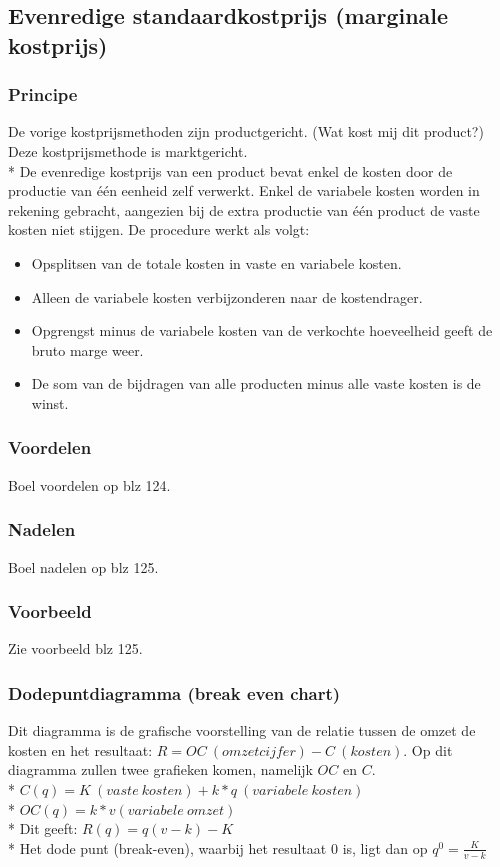 \documentclass[12pt]{article}
\begin{document}
\subsection{Evenredige standaardkostprijs (marginale kostprijs)}
\subsubsection{Principe}
De vorige kostprijsmethoden zijn productgericht. (Wat kost mij dit product?) Deze kostprijsmethode is marktgericht.\\*
De evenredige kostprijs van een product bevat enkel de kosten door de productie van \'e\'en eenheid zelf verwerkt. Enkel de variabele kosten worden in rekening gebracht, aangezien bij de extra productie van \'e\'en product de vaste kosten niet stijgen. De procedure werkt als volgt:
\begin{itemize}
\item Opsplitsen van de totale kosten in vaste en variabele kosten.
\item Alleen de variabele kosten verbijzonderen naar de kostendrager.
\item Opgrengst minus de variabele kosten van de verkochte hoeveelheid geeft de bruto marge weer.
\item De som van de bijdragen van alle producten minus alle vaste kosten is de winst.
\end{itemize}
\subsubsection{Voordelen}
Boel voordelen op blz 124.
\subsubsection{Nadelen}
Boel nadelen op blz 125.
\subsubsection{Voorbeeld}
Zie voorbeeld blz 125.
\subsubsection{Dodepuntdiagramma (break even chart)}
Dit diagramma is de grafische voorstelling van de relatie tussen de omzet de kosten en het resultaat: $R = OC\ (omzetcijfer) - C\ (kosten)$. Op dit diagramma zullen twee grafieken komen, namelijk $OC$ en $C$.\\*
$C(q) = K\ (vaste\ kosten) + k*q\ (variabele\ kosten)$\\*
$OC(q) = k*v (variabele\ omzet)$\\*
Dit geeft: $R(q) = q(v - k) - K$\\*
Het dode punt (break-even), waarbij het resultaat 0 is, ligt dan op $q^0 = \frac{K}{v-k}$
\end{document}
